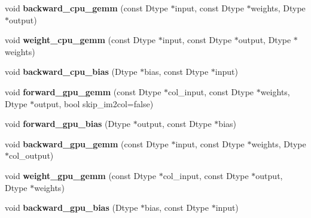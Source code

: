 \begin{DoxyCompactItemize}
\mbox{\label{classcaffe_1_1_base_convolution_layer_a3006035856c7f49371fe2b93ed38c935}} 
void {\bfseries backward\+\_\+cpu\+\_\+gemm} (const Dtype $\ast$input, const Dtype $\ast$weights, Dtype $\ast$output)
\item 
\mbox{\label{classcaffe_1_1_base_convolution_layer_aa0ce44e831ad98176dc8c06f2069df2e}} 
void {\bfseries weight\+\_\+cpu\+\_\+gemm} (const Dtype $\ast$input, const Dtype $\ast$output, Dtype $\ast$weights)
\item 
\mbox{\label{classcaffe_1_1_base_convolution_layer_a840ea8c0a485047a9760b7194b68db0c}} 
void {\bfseries backward\+\_\+cpu\+\_\+bias} (Dtype $\ast$bias, const Dtype $\ast$input)
\item 
\mbox{\label{classcaffe_1_1_base_convolution_layer_ace6f5e890e06e4812cf10e841f279346}} 
void {\bfseries forward\+\_\+gpu\+\_\+gemm} (const Dtype $\ast$col\+\_\+input, const Dtype $\ast$weights, Dtype $\ast$output, bool skip\+\_\+im2col=false)
\item 
\mbox{\label{classcaffe_1_1_base_convolution_layer_a2a1f9d98d332411a481d82c10d76b474}} 
void {\bfseries forward\+\_\+gpu\+\_\+bias} (Dtype $\ast$output, const Dtype $\ast$bias)
\item 
\mbox{\label{classcaffe_1_1_base_convolution_layer_aece62d609b5fb36990ef6d5c48472efe}} 
void {\bfseries backward\+\_\+gpu\+\_\+gemm} (const Dtype $\ast$input, const Dtype $\ast$weights, Dtype $\ast$col\+\_\+output)
\item 
\mbox{\label{classcaffe_1_1_base_convolution_layer_a2c2e76ae5046570087f6af56180787b5}} 
void {\bfseries weight\+\_\+gpu\+\_\+gemm} (const Dtype $\ast$col\+\_\+input, const Dtype $\ast$output, Dtype $\ast$weights)
\item 
\mbox{\label{classcaffe_1_1_base_convolution_layer_abbaf526a70e5106b79d8da94e8d4aa06}} 
void {\bfseries backward\+\_\+gpu\+\_\+bias} (Dtype $\ast$bias, const Dtype $\ast$input)

\end{DoxyCompactItemize}
